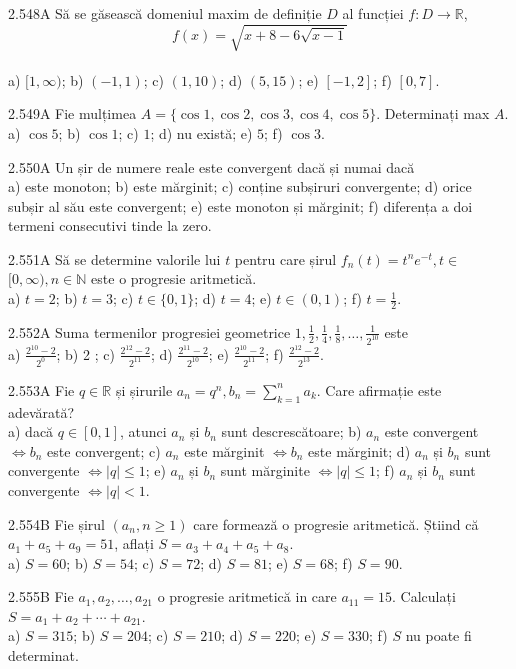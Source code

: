 \documentclass[11pt]{article}
\begin{document}
2.548A Să se găsească domeniul maxim de definiție $D$ al funcției $f: D \rightarrow \mathbb{R}$, $$f(x)=\sqrt{x+8-6 \sqrt{x-1}}$$\\ a) $[1, \infty)$; b) $(-1,1)$; c) $(1,10)$; d) $(5,15)$; e) $[-1,2]$; f) $[0,7]$.

2.549A Fie mulțimea $A=\{\cos 1, \cos 2, \cos 3, \cos 4, \cos 5\}$. Determinați max $A$.\\ a) $\cos 5$; b) $\cos 1$; c) $1$; d) nu există; e) $5$; f) $\cos 3$.

2.550A Un șir de numere reale este convergent dacă și numai dacă\\ a) este monoton; b) este mărginit; c) conține subșiruri convergente; d) orice subșir al său este convergent; e) este monoton și mărginit; f) diferența a doi termeni consecutivi tinde la zero.

2.551A Să se determine valorile lui $t$ pentru care șirul $f_{n}(t)=t^{n} e^{-t}, t \in$ $[0, \infty), n \in \mathbb{N}$ este o progresie aritmetică.\\ a) $t=2$; b) $t=3$; c) $t \in\{0,1\}$; d) $t=4$; e) $t \in(0,1)$; f) $t=\frac{1}{2}$.

2.552A Suma termenilor progresiei geometrice $1, \frac{1}{2}, \frac{1}{4}, \frac{1}{8}, \ldots, \frac{1}{2^{10}}$ este\\ a) $\frac{2^{10}-2}{2^{0}}$; b) 2 ; c) $\frac{2^{12}-2}{2^{11}}$; d) $\frac{2^{11}-2}{2^{10}}$; e) $\frac{2^{10}-2}{2^{11}}$; f) $\frac{2^{12}-2}{2^{13}}$.

2.553A Fie $q \in \mathbb{R}$ și șirurile $a_{n}=q^{n}, b_{n}=\sum_{k=1}^{n} a_{k}$. Care afirmație este adevărată?\\ a) dacă $q \in[0,1]$, atunci $a_{n}$ și $b_{n}$ sunt descrescătoare; b) $a_{n}$ este convergent $\Leftrightarrow b_{n}$ este convergent; c) $a_{n}$ este mărginit $\Leftrightarrow b_{n}$ este mărginit; d) $a_{n}$ și $b_{n}$ sunt convergente $\Leftrightarrow|q| \leq 1$; e) $a_{n}$ și $b_{n}$ sunt mărginite $\Leftrightarrow|q| \leq 1$; f) $a_{n}$ și $b_{n}$ sunt convergente $\Leftrightarrow|q|<1$.

2.554B Fie șirul $\left(a_{n}, n \geq 1\right)$ care formează o progresie aritmetică. Știind că $a_{1}+a_{5}+a_{9}=51$, aflați $S=a_{3}+a_{4}+a_{5}+a_{8}$.\\ a) $S=60$; b) $S=54$; c) $S=72$; d) $S=81$; e) $S=68$; f) $S=90$.

2.555B Fie $a_{1}, a_{2}, \ldots, a_{21}$ o progresie aritmetică in care $a_{11}=15$. Calculați $S=a_{1}+a_{2}+\cdots+a_{21}$.\\ a) $S=315$; b) $S=204$; c) $S=210$; d) $S=220$; e) $S=330$; f) $S$ nu poate fi determinat.
\end{document}
